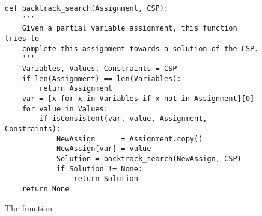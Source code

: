  \begin{figure}[!ht]
\centering
\begin{verbatim}          
def backtrack_search(Assignment, CSP):
    '''
    Given a partial variable assignment, this function tries to 
    complete this assignment towards a solution of the CSP.
    '''
    Variables, Values, Constraints = CSP
    if len(Assignment) == len(Variables): 
        return Assignment
    var = [x for x in Variables if x not in Assignment][0]
    for value in Values:
        if isConsistent(var, value, Assignment, Constraints):
            NewAssign      = Assignment.copy()
            NewAssign[var] = value
            Solution = backtrack_search(NewAssign, CSP)
            if Solution != None:
                return Solution
    return None 
\end{verbatim}
\vspace*{-0.3cm}
\caption{The function }
\label{fig:CSP-Solver.ipynb-backtrack_search}
\end{figure}

